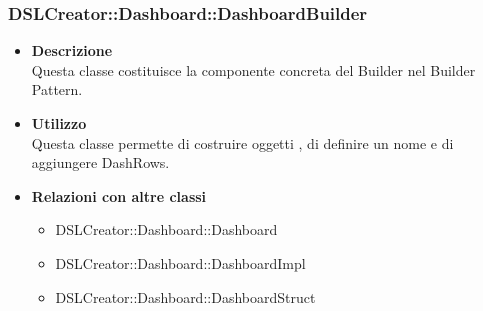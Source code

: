                 \subsubsection{DSLCreator::Dashboard::DashboardBuilder}
                    \begin{itemize}
                        \item \textbf{Descrizione} \hfill \\
                            Questa classe costituisce la componente concreta del Builder nel Builder Pattern.
                        \item \textbf{Utilizzo} \hfill \\
                            Questa classe permette di costruire oggetti , di definire un nome e di aggiungere DashRows.
                        \item \textbf{Relazioni con altre classi}
                            \begin{itemize}
                              \item DSLCreator::Dashboard::Dashboard
                              \item DSLCreator::Dashboard::DashboardImpl
                              \item DSLCreator::Dashboard::DashboardStruct
                            \end{itemize}
                    \end{itemize}

